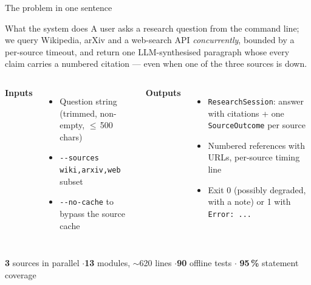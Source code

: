\documentclass[aspectratio=169,11pt]{beamer}
\begin{document}
\begin{frame}{The problem in one sentence}
  \begin{block}{What the system does}
    A user asks a research question from the command line; we query Wikipedia, arXiv and a
    web-search API \emph{concurrently}, bounded by a per-source timeout, and return one
    LLM-synthesised paragraph whose every claim carries a numbered citation --- even when one of the
    three sources is down.
  \end{block}

  \vspace{0.2em}
  \begin{columns}[T,onlytextwidth]
  \textbf{Inputs}
  \begin{itemize}\setlength\itemsep{1pt}
    \item Question string (trimmed, non-empty, $\le$\,500 chars)
    \item \texttt{-{}-sources wiki,arxiv,web} subset
    \item \texttt{-{}-no-cache} to bypass the source cache
  \end{itemize}

  \textbf{Outputs}
  \begin{itemize}\setlength\itemsep{1pt}
    \item \texttt{ResearchSession}: answer with citations + one \texttt{SourceOutcome} per source
    \item Numbered references with URLs, per-source timing line
    \item Exit 0 (possibly degraded, with a note) or 1 with \texttt{Error: ...}
  \end{itemize}
  \end{columns}

  \vspace{0.3em}
  {\footnotesize\textbf{3} sources in parallel \quad$\cdot$\quad \textbf{13} modules,
  $\sim$620 lines \quad$\cdot$\quad \textbf{90} offline tests \quad$\cdot$\quad
  \textbf{95\,\%} statement coverage}
\end{frame}
\end{document}
